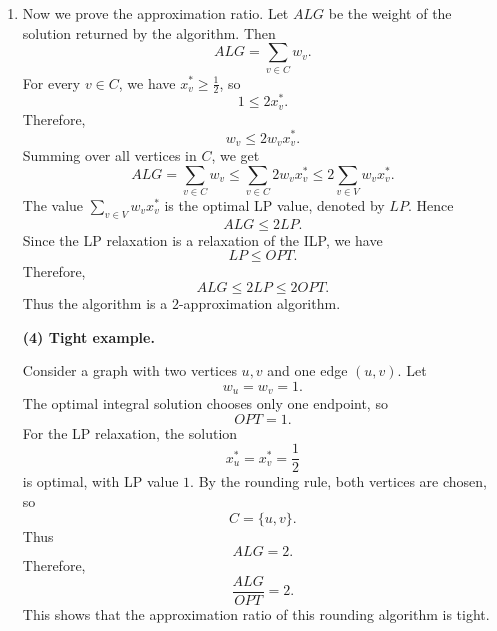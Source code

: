 \documentclass[12pt,a4paper]{article}
\makeatletter
\newtheorem*{solution}{Solution}
\theoremstyle{definition}
\renewenvironment{solution}[1][Solution] {\par\pushQED{\qed}\normalfont\topsep6\p@\@plus6\p@\relax\trivlist\item[\hskip\labelsep\bfseries#1\@addpunct{.}]\ignorespaces}{\popQED\endtrivlist\@endpefalse} \makeatother
\makeatother
\begin{document}
\begin{enumerate}
\begin{solution}
    Now we prove the approximation ratio. Let \(ALG\) be the weight of the solution returned by the algorithm. Then
    \[
    ALG=\sum_{v\in C}w_v.
    \]
    For every \(v\in C\), we have \(x_v^*\ge \frac12\), so
    \[
    1\le 2x_v^*.
    \]
    Therefore,
    \[
    w_v\le 2w_vx_v^*.
    \]
    Summing over all vertices in \(C\), we get
    \[
    ALG=\sum_{v\in C}w_v
    \le \sum_{v\in C}2w_vx_v^*
    \le 2\sum_{v\in V}w_vx_v^*.
    \]
    The value \(\sum_{v\in V}w_vx_v^*\) is the optimal LP value, denoted by \(LP\). Hence
    \[
    ALG\le 2LP.
    \]
    Since the LP relaxation is a relaxation of the ILP, we have
    \[
    LP\le OPT.
    \]
    Therefore,
    \[
    ALG\le 2LP\le 2OPT.
    \]
    Thus the algorithm is a \(2\)-approximation algorithm.
    
    \textbf{(4) Tight example.}
    
    Consider a graph with two vertices \(u,v\) and one edge \((u,v)\). Let
    \[
    w_u=w_v=1.
    \]
    The optimal integral solution chooses only one endpoint, so
    \[
    OPT=1.
    \]
    For the LP relaxation, the solution
    \[
    x_u^*=x_v^*=\frac12
    \]
    is optimal, with LP value \(1\). By the rounding rule, both vertices are chosen, so
    \[
    C=\{u,v\}.
    \]
    Thus
    \[
    ALG=2.
    \]
    Therefore,
    \[
    \frac{ALG}{OPT}=2.
    \]
    This shows that the approximation ratio of this rounding algorithm is tight.
    \end{solution}





\end{enumerate}

\end{document}
